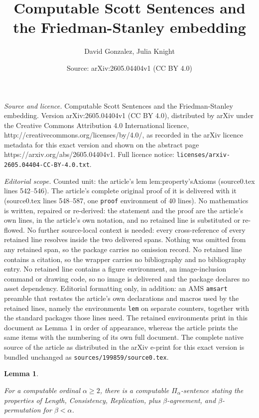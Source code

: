 \documentclass[10pt,a4paper]{amsart}
\title{Computable Scott Sentences and the Friedman-Stanley embedding}
\author{David Gonzalez, Julia Knight}
\date{Source: arXiv:2605.04404v1 (CC BY 4.0)}
\newtheorem{lem}{Lemma}
\begin{document}
\maketitle

\noindent\emph{Source and licence.} Computable Scott Sentences and the Friedman-Stanley embedding. Version arXiv:2605.04404v1 (CC BY 4.0), distributed by arXiv under the Creative Commons Attribution 4.0 International licence, http://creativecommons.org/licenses/by/4.0/, as recorded in the arXiv licence metadata for this exact version and shown on the abstract page https://arxiv.org/abs/2605.04404v1. Full licence notice: \texttt{licenses/arxiv-2605.04404-CC-BY-4.0.txt}.\par\smallskip

\noindent\textit{Editorial scope.} Counted unit: the article's lem lem:property'sAxioms (source0.tex lines 542--546). The article's complete original proof of it is delivered with it (source0.tex lines 548--587, one \texttt{proof} environment of 40 lines). No mathematics is written, repaired or re-derived: the statement and the proof are the article's own lines, in the article's own notation, and no retained line is substituted or re-flowed.  No further source-local context is needed: every cross-reference of every retained line resolves inside the two delivered spans.  Nothing was omitted from any retained span, so the package carries no omission record.  No retained line contains a citation, so the wrapper carries no bibliography and no bibliography entry.  No retained line contains a figure environment, an image-inclusion command or drawing code, so no image is delivered and the package declares no asset dependency.  Editorial formatting only, in addition: an AMS \texttt{amsart} preamble that restates the article's own declarations and macros used by the retained lines, namely the environments \texttt{lem} on separate counters, together with the standard packages those lines need.  The retained environments print in this document as Lemma 1 in order of appearance, whereas the article prints the same items with the numbering of its own full document.  The complete native source of the article as distributed in the arXiv e-print for this exact version is bundled unchanged as \texttt{sources/199859/source0.tex}.
\begin{lem}\label{lem:property'sAxioms}

For a computable ordinal $\alpha\geq 2$, there is a computable $\Pi_\alpha$-sentence stating the properties of Length, Consistency, Replication, plus $\beta$-agreement, and $\beta$-permutation for $\beta < \alpha$.  

\end{lem}
\end{document}
